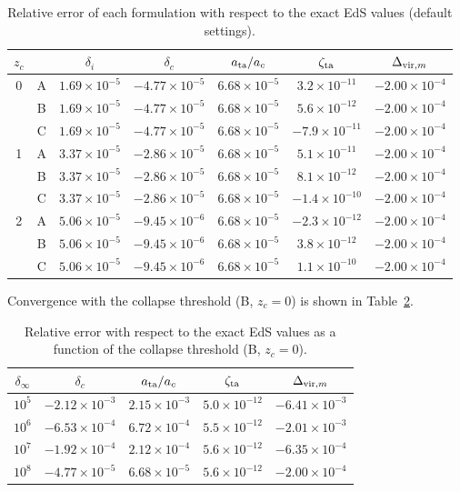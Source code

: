 \documentclass[11pt,a4paper]{article}
\begin{document}
\begin{table}[htbp]
\centering
\caption{Relative error of each formulation with respect to the exact EdS values (default settings).}
\label{tab:eds}
\small
\begin{tabular}{c c c c c c c}
\toprule
$z_c$ & & $\delta_i$ & $\delta_c$ & $a_{\rm ta}/a_c$ & $\zeta_{\rm ta}$ & $\Delta_{{\rm vir},m}$\\
\midrule
0 & A & $1.69\times10^{-5}$ & $-4.77\times10^{-5}$ & $6.68\times10^{-5}$ & $3.2\times10^{-11}$ & $-2.00\times10^{-4}$\\
  & B & $1.69\times10^{-5}$ & $-4.77\times10^{-5}$ & $6.68\times10^{-5}$ & $5.6\times10^{-12}$ & $-2.00\times10^{-4}$\\
  & C & $1.69\times10^{-5}$ & $-4.77\times10^{-5}$ & $6.68\times10^{-5}$ & $-7.9\times10^{-11}$ & $-2.00\times10^{-4}$\\
1 & A & $3.37\times10^{-5}$ & $-2.86\times10^{-5}$ & $6.68\times10^{-5}$ & $5.1\times10^{-11}$ & $-2.00\times10^{-4}$\\
  & B & $3.37\times10^{-5}$ & $-2.86\times10^{-5}$ & $6.68\times10^{-5}$ & $8.1\times10^{-12}$ & $-2.00\times10^{-4}$\\
  & C & $3.37\times10^{-5}$ & $-2.86\times10^{-5}$ & $6.68\times10^{-5}$ & $-1.4\times10^{-10}$ & $-2.00\times10^{-4}$\\
2 & A & $5.06\times10^{-5}$ & $-9.45\times10^{-6}$ & $6.68\times10^{-5}$ & $-2.3\times10^{-12}$ & $-2.00\times10^{-4}$\\
  & B & $5.06\times10^{-5}$ & $-9.45\times10^{-6}$ & $6.68\times10^{-5}$ & $3.8\times10^{-12}$ & $-2.00\times10^{-4}$\\
  & C & $5.06\times10^{-5}$ & $-9.45\times10^{-6}$ & $6.68\times10^{-5}$ & $1.1\times10^{-10}$ & $-2.00\times10^{-4}$\\
\bottomrule
\end{tabular}
\end{table}

Convergence with the collapse threshold (B, $z_c=0$) is shown in Table~\ref{tab:eds_th}.

\begin{table}[htbp]
\centering
\caption{Relative error with respect to the exact EdS values as a function of the collapse threshold (B, $z_c=0$).}
\label{tab:eds_th}
\small
\begin{tabular}{c c c c c}
\toprule
$\delta_\infty$ & $\delta_c$ & $a_{\rm ta}/a_c$ & $\zeta_{\rm ta}$ & $\Delta_{{\rm vir},m}$\\
\midrule
$10^5$ & $-2.12\times10^{-3}$ & $2.15\times10^{-3}$ & $5.0\times10^{-12}$ & $-6.41\times10^{-3}$\\
$10^6$ & $-6.53\times10^{-4}$ & $6.72\times10^{-4}$ & $5.5\times10^{-12}$ & $-2.01\times10^{-3}$\\
$10^7$ & $-1.92\times10^{-4}$ & $2.12\times10^{-4}$ & $5.6\times10^{-12}$ & $-6.35\times10^{-4}$\\
$10^8$ & $-4.77\times10^{-5}$ & $6.68\times10^{-5}$ & $5.6\times10^{-12}$ & $-2.00\times10^{-4}$\\
\bottomrule
\end{tabular}
\end{table}
\end{document}
